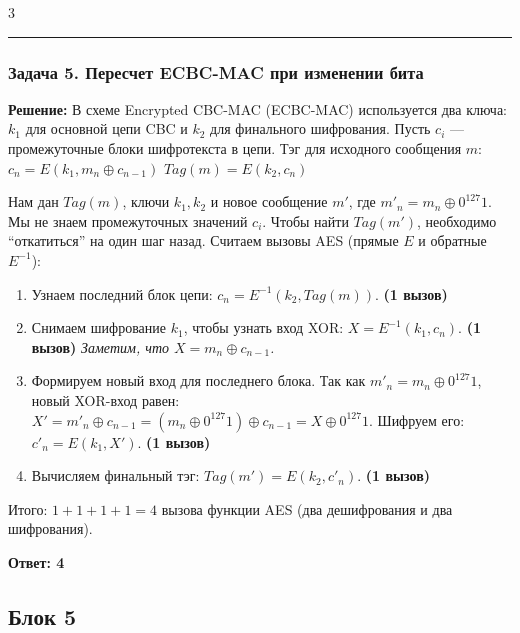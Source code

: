 ﻿\documentclass[9pt,a4paper,landscape]{extarticle}
\newcommand{\tightlist}{}
\begin{document}
\begin{multicols*}{3}
\begin{center}\rule{0.5\linewidth}{0.5pt}\end{center}

\subsubsection{Задача 5. Пересчет ECBC-MAC при изменении бита}\label{ux437ux430ux434ux430ux447ux430-5.-ux43fux435ux440ux435ux441ux447ux435ux442-ecbc-mac-ux43fux440ux438-ux438ux437ux43cux435ux43dux435ux43dux438ux438-ux431ux438ux442ux430}

\textbf{Решение:} В схеме Encrypted CBC-MAC (ECBC-MAC) используется два ключа: \(k_1\) для основной цепи CBC и \(k_2\) для финального шифрования. Пусть \(c_{i}\) --- промежуточные блоки шифротекста в цепи. Тэг для исходного сообщения \(m\): \(c_n = E(k_1, m_n \oplus c_{n-1})\) \(Tag(m) = E(k_2, c_n)\)

Нам дан \(Tag(m)\), ключи \(k_1, k_2\) и новое сообщение \(m'\), где \(m'_n = m_n \oplus 0^{127}1\). Мы не знаем промежуточных значений \(c_i\). Чтобы найти \(Tag(m')\), необходимо ``откатиться'' на один шаг назад. Считаем вызовы AES (прямые \(E\) и обратные \(E^{-1}\)):

\begin{enumerate}
\def\labelenumi{\arabic{enumi}.}
\tightlist
\item
  Узнаем последний блок цепи: \(c_n = E^{-1}(k_2, Tag(m))\). \textbf{(1 вызов)}
\item
  Снимаем шифрование \(k_1\), чтобы узнать вход XOR: \(X = E^{-1}(k_1, c_n)\). \textbf{(1 вызов)} \emph{Заметим, что \(X = m_n \oplus c_{n-1}\).}
\item
  Формируем новый вход для последнего блока. Так как \(m'_n = m_n \oplus 0^{127}1\), новый XOR-вход равен: \(X' = m'_n \oplus c_{n-1} = (m_n \oplus 0^{127}1) \oplus c_{n-1} = X \oplus 0^{127}1\). Шифруем его: \(c'_n = E(k_1, X')\). \textbf{(1 вызов)}
\item
  Вычисляем финальный тэг: \(Tag(m') = E(k_2, c'_n)\). \textbf{(1 вызов)}
\end{enumerate}

Итого: \(1 + 1 + 1 + 1 = 4\) вызова функции AES (два дешифрования и два шифрования).

\textbf{Ответ: 4}

\subsection{Блок 5}\label{ux431ux43bux43eux43a-5}


\end{multicols*}
\end{document}
